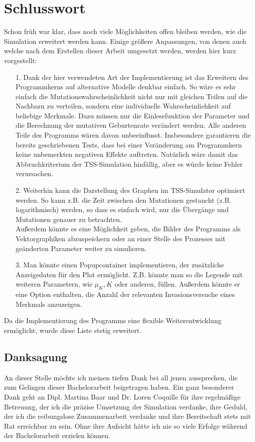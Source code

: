 \documentclass[11pt, a4paper, german]{article}
\theoremstyle{plain}
\begin{document}
\section{Schlusswort}
Schon früh war klar, dass noch viele Möglichkeiten offen bleiben werden, wie die Simulation erweitert werden kann. Einige größere Anpassungen, von denen auch welche nach dem Erstellen dieser Arbeit umgesetzt werden, werden hier kurz vorgestellt:
\begin{itemize}
	\item[1.] Dank der hier verwendeten Art der Implementierung ist das Erweitern des Programmkerns auf alternative Modelle denkbar einfach. So wäre es sehr einfach die Mutationswahrscheinlichkeit nicht nur mit gleichen Teilen auf die Nachbarn zu verteilen, sondern eine individuelle Wahrscheinlichkeit auf beliebige Merkmale. Dazu müssen nur die Einlesefunktion der Parameter und die Berechnung der mutativen Geburtenrate verändert werden. Alle anderen Teile des Programms wären davon unbeeinflusst. Insbesondere garantieren die bereits geschriebenen Tests, dass bei einer Veränderung am Programmkern keine unbemerkten negativen Effekte auftreten. Natürlich wäre damit das Abbruchkriterium der TSS-Simulation hinfällig, aber es würde keine Fehler verursachen.
	\item[2.] Weiterhin kann die Darstellung des Graphen im TSS-Simulator optimiert werden. So kann z.B. die Zeit zwischen den Mutationen gestaucht (z.B. logarithmisch) werden, so dass es einfach wird, nur die Übergänge und Mutationen genauer zu betrachten. \\
	Außerdem könnte es eine Möglichkeit geben, die Bilder des Programms als Vektorgraphiken abzuspeichern oder an einer Stelle des Prozesses mit geänderten Parameter weiter zu simulieren.
	\item[3.] Man könnte einen Popupcontainer implementieren, der zusätzliche Anzeigedaten für den Plot ermöglicht. Z.B. könnte man so die Legende mit weiteren Parametern, wie $ \mu_K, K $ oder anderen, füllen. Außerdem könnte er eine Option enthalten, die Anzahl der relevanten Invasionsversuche eines Merkmals anzuzeigen.
\end{itemize}
Da die Implementierung des Programms eine flexible Weiterentwicklung ermöglicht, wurde diese Liste stetig erweitert.

\subsection{Danksagung}
An dieser Stelle möchte ich meinen tiefen Dank bei all jenen aussprechen, die zum Gelingen dieser Bachelorarbeit beigetragen haben. Ein ganz besonderer Dank geht an Dipl. Martina Baar und Dr. Loren Coquille für ihre regelmäßige Betreuung, der ich die präzise Umsetzung der Simulation verdanke, ihre Geduld, der ich die reibungslose Zusammenarbeit verdanke und ihre Bereitschaft stets mit Rat erreichbar zu sein. Ohne ihre Aufsicht hätte ich nie so viele Erfolge während der Bachelorarbeit erzielen können.

\clearpage

\end{document}
